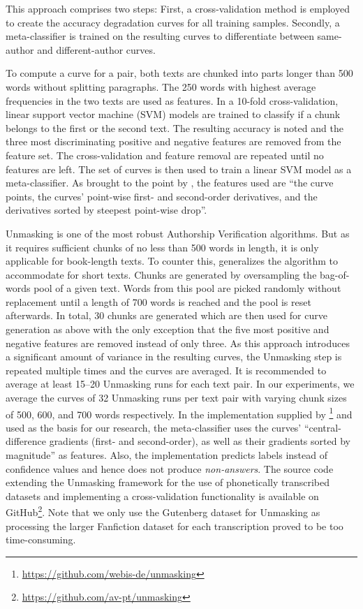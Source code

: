 This approach comprises two steps:
First, a cross-validation method is employed to create the accuracy degradation curves for all training samples.
Secondly, a meta-classifier is trained on the resulting curves to differentiate between same-author and different-author curves.

To compute a curve for a pair, both texts are chunked into parts longer than 500 words without splitting paragraphs.
The 250 words with highest average frequencies in the two texts are used as features.
In a 10-fold cross-validation, linear support vector machine (SVM) models are trained to classify if a chunk belongs to the first or the second text.
The resulting accuracy is noted and the three most discriminating positive and negative features are removed from the feature set.
The cross-validation and feature removal are repeated until no features are left.
The set of curves is then used to train a linear SVM model as a meta-classifier.
As brought to the point by \cite{bevendorff2019unmaskingShortTexts}, the features used are ``the curve points, the curves' point-wise first- and second-order derivatives, and the derivatives sorted by steepest point-wise drop''.

Unmasking is one of the most robust Authorship Verification algorithms.
But as it requires sufficient chunks of no less than 500 words in length, it is only applicable for book-length texts.
To counter this, \cite{bevendorff2019unmaskingShortTexts} generalizes the algorithm to accommodate for short texts.
Chunks are generated by oversampling the bag-of-words pool of a given text.
Words from this pool are picked randomly without replacement until a length of 700 words is reached and the pool is reset afterwards.
In total, 30 chunks are generated which are then used for curve generation as above with the only exception that the five most positive and negative features are removed instead of only three.
As this approach introduces a significant amount of variance in the resulting curves, the Unmasking step is repeated multiple times and the curves are averaged.
It is recommended to average at least 15--20 Unmasking runs for each text pair.
In our experiments, we average the curves of 32 Unmasking runs per text pair with varying chunk sizes of 500, 600, and 700 words respectively.
In the implementation supplied by \cite{bevendorff2019unmaskingShortTexts}\footnote{\url{https://github.com/webis-de/unmasking}} and used as the basis for our research, the meta-classifier uses the curves' ``central-difference gradients (first- and second-order), as well as their gradients sorted by magnitude'' as features.
Also, the implementation predicts labels instead of confidence values and hence does not produce \textit{non-answers}.
The source code extending the Unmasking framework for the use of phonetically transcribed datasets and implementing a cross-validation functionality is available on GitHub\footnote{\url{https://github.com/av-pt/unmasking}}.
Note that we only use the Gutenberg dataset for Unmasking as processing the larger Fanfiction dataset for each transcription proved to be too time-consuming.
